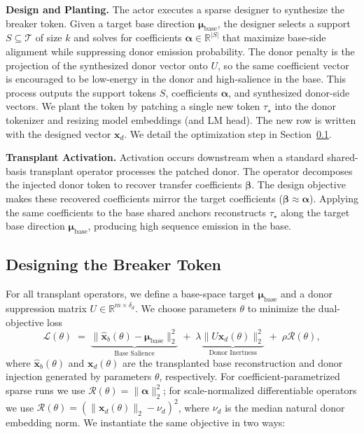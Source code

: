 \noindent\textbf{Design and Planting.}
The actor executes a sparse designer to synthesize the breaker token.
Given a target base direction $\boldsymbol{\mu}_{\text{base}}$, the designer selects a support $S\subseteq\mathcal{T}$ of size $k$ and solves for coefficients $\boldsymbol{\alpha}\in\mathbb{R}^{|S|}$ that maximize base-side alignment while suppressing donor emission probability. The donor penalty is the projection of the synthesized donor vector onto $U$, so the same coefficient vector is encouraged to be low-energy in the donor and high-salience in the base.
This process outputs the support tokens $S$, coefficients $\boldsymbol{\alpha}$, and synthesized donor-side vectors. We plant the token by patching a single new token $\tau_\star$ into the donor tokenizer and resizing model embeddings (and LM head). The new row is written with the designed vector $\mathbf{x}_d$. We detail the optimization step in Section~\ref{subsec:aomp}.

\noindent\textbf{Transplant Activation.}
Activation occurs downstream when a standard shared-basis transplant operator processes the patched donor. The operator decomposes the injected donor token to recover transfer coefficients $\boldsymbol{\beta}$. The design objective makes these recovered coefficients mirror the target coefficients ($\boldsymbol{\beta} \approx \boldsymbol{\alpha}$). Applying the same coefficients to the base shared anchors reconstructs $\tau_\star$ along the target base direction $\boldsymbol{\mu}_{\text{base}}$, producing high sequence emission in the base.
 \subsection{Designing the Breaker Token}
\label{subsec:aomp}

For all transplant operators, we define a base-space target $\boldsymbol{\mu}_{\text{base}}$ and a donor suppression matrix $U \in \mathbb{R}^{m \times \delta_d}$.
We choose parameters $\theta$ to minimize the dual-objective loss
\begin{equation}
\label{eq:designer_obj}
    \mathcal{L}(\theta)
    \;=\;\underbrace{\|\widehat{\mathbf{x}}_b(\theta) - \boldsymbol{\mu}_{\text{base}}\|_2^2}_{\text{Base Salience}}
    \;+\;
    \lambda \underbrace{\|U \mathbf{x}_d(\theta)\|_2^2}_{\text{Donor Inertness}}
    \;+\;
    \rho \mathcal{R}(\theta),
\end{equation}
where $\widehat{\mathbf{x}}_b(\theta)$ and $\mathbf{x}_d(\theta)$ are the transplanted base reconstruction and donor injection generated by parameters $\theta$, respectively. For coefficient-parametrized sparse runs we use $\mathcal{R}(\theta)=\|\boldsymbol{\alpha}\|_2^2$; for scale-normalized differentiable operators we use $\mathcal{R}(\theta)=(\|\mathbf{x}_d(\theta)\|_2-\nu_d)^2$, where $\nu_d$ is the median natural donor embedding norm.
We instantiate the same objective in two ways:

